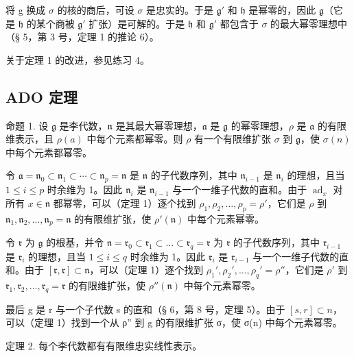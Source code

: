 将 g 换成 \(\sigma\) 的核的商后，可设 \(\sigma\) 是忠实的。于是 \(\mathfrak{g}'\) 和 \(\mathfrak{h}\) 是幂零的，因此 \(\mathfrak{g}\)（它是 \(\mathfrak{h}\) 的某个商被 \(\mathfrak{g}'\) 扩张）是可解的。于是 \(\mathfrak{h}\) 和 \(\mathfrak{g}'\) 都包含于 \(\sigma\) 的最大幂零理想中（§ 5，第 3 号，定理 1 的推论 6）。

关于定理 1 的改进，参见练习 4。

\subsection{ADO 定理}

命题 1. 设 \(\mathfrak{g}\) 是李代数，\(\mathfrak{n}\) 是其最大幂零理想，\(\mathfrak{a}\) 是 \(\mathfrak{g}\) 的幂零理想，\(\rho\) 是 \(\mathfrak{a}\) 的有限维表示，且 \(\rho(a)\) 中每个元素都幂零。则 \(\rho\) 有一个有限维扩张 \(\sigma\) 到 \(\mathfrak{g}\)，使 \(\sigma(n)\) 中每个元素都幂零。

令 \(\mathfrak{a} = \mathfrak{n}_0 \subset \mathfrak{n}_1 \subset \cdots \subset \mathfrak{n}_p = \mathfrak{n}\) 是 \(\mathfrak{n}\) 的子代数序列，其中 \(\mathfrak{n}_{i-1}\) 是 \(\mathfrak{n}_i\) 的理想，且当 \(1 \leqslant i \leqslant p\) 时余维为 1。因此 \(\mathfrak{n}_i\) 是 \(\mathfrak{n}_{i-1}\) 与一个一维子代数的直和。由于 \(\operatorname{ad}_x\) 对所有 \(x \in \mathfrak{n}\) 都幂零，可以（定理 1）逐个找到 \(\rho_1, \rho_2, \ldots, \rho_p = \rho'\)，它们是 \(\rho\) 到 \(\mathfrak{n}_1, \mathfrak{n}_2, \ldots, \mathfrak{n}_p = \mathfrak{n}\) 的有限维扩张，使 \(\rho'(\mathfrak{n})\) 中每个元素幂零。

令 \(\mathfrak{r}\) 为 \(\mathfrak{g}\) 的根基，并令 \(\mathfrak{n} = \mathfrak{r}_0 \subset \mathfrak{r}_1 \subset \dots \subset \mathfrak{r}_q = \mathfrak{r}\) 为 \(\mathfrak{r}\) 的子代数序列，其中 \(\mathfrak{r}_{i-1}\) 是 \(\mathfrak{r}_i\) 的理想，且当 \(1 \leqslant i \leqslant q\) 时余维为 1。因此 \(\mathfrak{r}_i\) 是 \(\mathfrak{r}_{i-1}\) 与一个一维子代数的直和。由于 \([\mathfrak{r}, \mathfrak{r}] \subset \mathfrak{n}\)，可以（定理 1）逐个找到 \(\rho_1', \rho_2', \ldots, \rho_q' = \rho''\)，它们是 \(\rho'\) 到 \(\mathfrak{r}_1, \mathfrak{r}_2, \ldots, \mathfrak{r}_q = \mathfrak{r}\) 的有限维扩张，使 \(\rho''(\mathfrak{n})\) 中每个元素幂零。

最后 g 是 r 与一个子代数 s 的直和（§ 6，第 8 号，定理 5）。由于 \([s, r] \subset n\)，可以（定理 1）找到一个从 ρ'' 到 g 的有限维扩张 σ，使 σ(n) 中每个元素幂零。

定理 2. 每个李代数都有有限维忠实线性表示。

